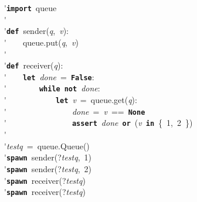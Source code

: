 \'\>\texttt{\textbf{import}}~queue\\

\'\>\\

\'\>\texttt{\textbf{def}}~sender(\textit{q},~\textit{v}):\\

\'\>~~~~queue.put(\textit{q},~\textit{v})\\

\'\>\\

\'\>\texttt{\textbf{def}}~receiver(\textit{q}):\\

\'\>~~~~\texttt{\textbf{let}}~\textit{done}~=~\texttt{\textbf{False}}:\\

\'\>~~~~~~~~\texttt{\textbf{while}}~\texttt{\textbf{not}}~\textit{done}:\\

\'\>~~~~~~~~~~~~\texttt{\textbf{let}}~\textit{v}~=~queue.get(\textit{q}):\\

\'\>~~~~~~~~~~~~~~~~\textit{done}~=~\textit{v}~==~\texttt{\textbf{None}}\\

\'\>~~~~~~~~~~~~~~~~\texttt{\textbf{assert}}~\textit{done}~\texttt{\textbf{or}}~(\textit{v}~\texttt{\textbf{in}}~\{~1,~2~\})\\

\'\>\\

\'\>\textit{testq}~=~queue.Queue()\\

\'\>\texttt{\textbf{spawn}}~sender(?\textit{testq},~1)\\

\'\>\texttt{\textbf{spawn}}~sender(?\textit{testq},~2)\\

\'\>\texttt{\textbf{spawn}}~receiver(?\textit{testq})\\

\'\>\texttt{\textbf{spawn}}~receiver(?\textit{testq})